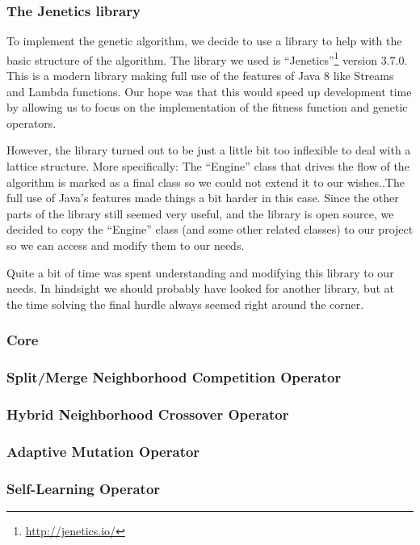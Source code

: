 \subsubsection{The Jenetics library}
To implement the genetic algorithm, we decide to use a library to help with the basic structure of the algorithm. The library we used is ``Jenetics''\footnote{\url{http://jenetics.io/}} version 3.7.0. This is a modern library making full use of the features of Java 8 like Streams and Lambda functions. Our hope was that this would speed up development time by allowing us to focus on the implementation of the fitness function and genetic operators. 
\par
However, the library turned out to be just a little bit too inflexible to deal with a lattice structure. More specifically: The ``Engine'' class that drives the flow of the algorithm is marked as a final class so we could not extend it to our wishes..The full use of Java's features made things a bit harder in this case. Since the other parts of the library still seemed very useful, and the library is open source, we decided to copy the ``Engine'' class (and some other related classes) to our project so we can access and modify them to our needs. 
\par
Quite a bit of time was spent understanding and modifying this library to our needs. In hindsight we should probably have looked for another library, but at the time solving the final hurdle always seemed right around the corner.
\subsubsection{Core}
\subsubsection{Split/Merge Neighborhood Competition Operator}
\subsubsection{Hybrid Neighborhood Crossover Operator}
\subsubsection{Adaptive Mutation Operator}
\subsubsection{Self-Learning Operator}



